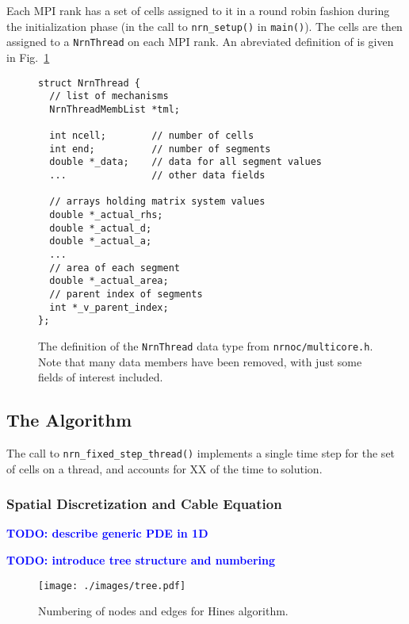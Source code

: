 \documentclass[11pt,a4paper]{article}
\newcommand{\todo}[1]{\textbf{\textcolor{Blue}{TODO: #1}}} %
\newcommand{\lst}[1]{\lstinline!#1!} %
\newcommand{\fig}[1]{Fig.~\ref{#1}} %
\newcommand{\file}[1]{\lstinline[basicstyle=\normalsize,]!#1!} %
\begin{document}
Each MPI rank has a set of cells assigned to it in a round robin fashion during the initialization phase (in the call to \lst{nrn_setup()} in \lst{main()}). The cells are then assigned to a \lst{NrnThread} on each MPI rank. An abreviated definition of is given in \fig{lst:NrnThread}
\begin{figure}
\begin{lstlisting}
struct NrnThread {
  // list of mechanisms
  NrnThreadMembList *tml;

  int ncell;        // number of cells
  int end;          // number of segments
  double *_data;    // data for all segment values
  ...               // other data fields

  // arrays holding matrix system values
  double *_actual_rhs;
  double *_actual_d;
  double *_actual_a;
  ...
  // area of each segment
  double *_actual_area;
  // parent index of segments
  int *_v_parent_index;
};
\end{lstlisting}
\label{lst:NrnThread}
\caption{The definition of the \lst{NrnThread} data type from \file{nrnoc/multicore.h}. Note that many data members have been removed, with just some fields of interest included.}
\end{figure}

\subsection{The Algorithm}
The call to \lst{nrn_fixed_step_thread()} implements a single time step for the set of cells on a thread, and accounts for XX of the time to solution.

\subsubsection{Spatial Discretization and Cable Equation}
\todo{describe generic PDE in 1D}

\todo{introduce tree structure and numbering}

\begin{figure}[htp!]
\centering
\texttt{[image: ./images/tree.pdf]}
\caption{Numbering of nodes and edges for Hines algorithm.}
\label{fig:tree}
\end{figure}
\end{document}
